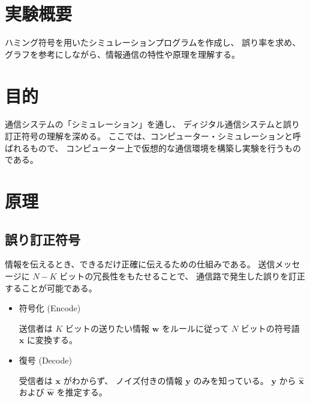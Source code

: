 \documentclass[12pt]{jarticle}
\begin{document}



\section{実験概要}
ハミング符号を用いたシミュレーションプログラムを作成し、
誤り率を求め、グラフを参考にしながら、情報通信の特性や原理を理解する。

\section{目的}
通信システムの「シミュレーション」を通し、
ディジタル通信システムと誤り訂正符号の理解を深める。
ここでは、コンピューター・シミュレーションと呼ばれるもので、
コンピューター上で仮想的な通信環境を構築し実験を行うものである。

\section{原理}

\subsection{誤り訂正符号}

情報を伝えるとき、できるだけ正確に伝えるための仕組みである。
送信メッセージに $N − K$ ビットの冗長性をもたせることで、
通信路で発生した誤りを訂正することが可能である。

\begin{itemize}
    \item 符号化 (Encode)

          送信者は $K$ ビットの送りたい情報 $\boldsymbol{w}$ をルールに従って
          $N$ ビットの符号語 $\boldsymbol{x}$ に変換する。
    \item 復号 (Decode)

          受信者は $\boldsymbol{x}$ がわからず、
          ノイズ付きの情報 $\boldsymbol{y}$ のみを知っている。
          $\boldsymbol{y}$ から $\hat{\boldsymbol{x}}$ および $\hat{\boldsymbol{w}}$ を推定する。
\end{itemize}
\end{document}
